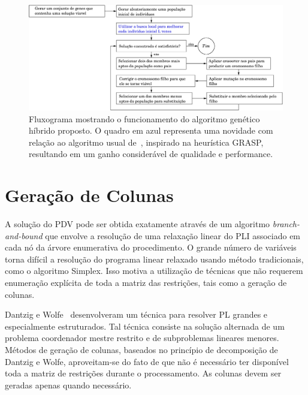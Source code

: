 \begin{figure}[htbp]
	\begin{center}
		\includegraphics[scale=0.6]{fig/genetic.eps}
		\caption{Fluxograma mostrando o funcionamento do algoritmo genético híbrido proposto. O quadro 
		em azul representa uma novidade com relação ao algoritmo usual de~\cite{beasley96,kornilakis02},
		inspirado na heurística GRASP, resultando em um ganho considerável de qualidade e performance.}
		\label{fig:genetico}
	\end{center}
\end{figure}


\section{Geração de Colunas}
\label{sec:metodos_colunas}

A solução do PDV pode ser obtida exatamente através de um algoritmo {\it branch-and-bound} que
envolve a resolução de uma relaxação linear do PLI associado em cada nó da árvore enumerativa do
procedimento. O grande número de variáveis torna difícil a resolução do programa linear relaxado
usando método tradicionais, como o algoritmo Simplex. Isso motiva a utilização de técnicas que não
requerem enumeração explícita de toda a matriz das restrições, tais como a geração de colunas.

Dantzig e Wolfe~\cite{dantzig60} desenvolveram um técnica para resolver PL grandes e especialmente
estruturados. Tal técnica consiste na solução alternada de um problema coordenador mestre restrito e
de subproblemas lineares menores. Métodos de geração de colunas, baseados no princípio de
decomposição de Dantzig e Wolfe, aproveitam-se do fato de que não é necessário ter disponível toda a
matriz de restrições durante o processamento. As colunas devem ser geradas apenas quando necessário.

